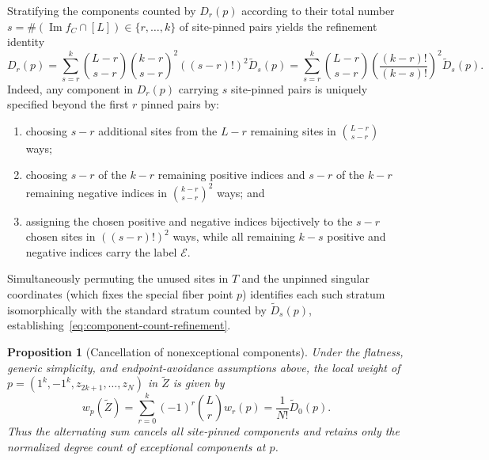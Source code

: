 \documentclass[11pt]{article}
\newtheorem{proposition}{Proposition}[section]
\theoremstyle{definition}
\DeclareMathOperator{\Ima}{Im}
\begin{document}
Stratifying the components counted by $D_r(p)$ according to their total
number $s=\#(\Ima f_C\cap[L])\in\{r,\ldots,k\}$ of site-pinned pairs yields the refinement identity
\begin{equation}\label{eq:component-count-refinement}
 \boxed{D_r(p)=\sum_{s=r}^k
 \binom{L-r}{s-r}\binom{k-r}{s-r}^{\!2}((s-r)!)^2
 \tilde{D}_s(p)
 =\sum_{s=r}^k\binom{L-r}{s-r}
       \left(\frac{(k-r)!}{(k-s)!}\right)^2\tilde{D}_s(p).}
\end{equation}
Indeed, any component in $D_r(p)$ carrying $s$ site-pinned pairs is uniquely specified beyond the first $r$ pinned pairs by:
\begin{enumerate}
 \item choosing $s-r$ additional sites from the $L-r$ remaining sites in $\binom{L-r}{s-r}$ ways;
 \item choosing $s-r$ of the $k-r$ remaining positive indices and $s-r$ of the $k-r$ remaining negative indices in $\binom{k-r}{s-r}^2$ ways; and
 \item assigning the chosen positive and negative indices bijectively to the $s-r$ chosen sites in $((s-r)!)^2$ ways, while all remaining $k-s$ positive and negative indices carry the label $\mathcal{E}$.
\end{enumerate}
Simultaneously permuting the unused sites in $T$ and the unpinned singular coordinates (which fixes the special fiber point $p$) identifies each such stratum isomorphically with the standard stratum counted by $\tilde{D}_s(p)$, establishing~\eqref{eq:component-count-refinement}.

\begin{proposition}[Cancellation of nonexceptional components]
\label{prop:exceptional-component-cancellation}
Under the flatness, generic simplicity, and endpoint-avoidance
assumptions above, the local weight of $p=(1^k,-1^k,z_{2k+1},\ldots,z_N)$ in $\tilde{Z}$ is given by
\begin{equation}\label{eq:exceptional-component-weight}
 \boxed{w_p(\tilde{Z})
 =\sum_{r=0}^k(-1)^r\binom{L}{r} w_r(p)
 =\frac{1}{N!}\tilde{D}_0(p).}
\end{equation}
Thus the alternating sum cancels all site-pinned components and retains only the normalized degree count of exceptional
components at $p$.
\end{proposition}
\end{document}
